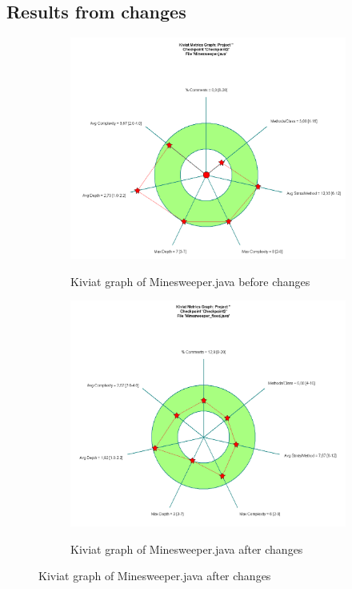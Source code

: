 \documentclass[UKenglish]{article}  %
\begin{document}
\subsection{Results from changes}
\begin{figure}[h]
	\begin{subfigure}[b]{0.5\textwidth}
		\caption{Kiviat graph of Minesweeper.java before changes}
		\includegraphics[width=\textwidth]{kiviat_minesweeper_before}
		\label{minesweeper_before}
	\end{subfigure}
	\begin{subfigure}[b]{0.5\textwidth}
		\caption{Kiviat graph of Minesweeper.java after changes}
		\includegraphics[width=\textwidth]{kiviat_minesweeper_after}
		\label{minesweeper_after}
	\end{subfigure}
\end{figure}
\end{document}
